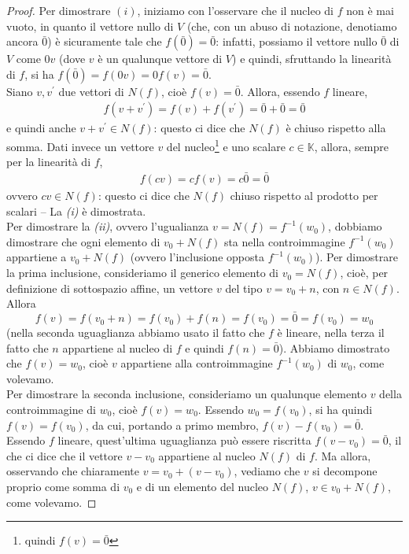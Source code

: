\begin{proof}
  Per dimostrare $(i)$, iniziamo con l'osservare che il nucleo di $f$ non è mai vuoto, in quanto il vettore
  nullo di $V$ (che, con un abuso di notazione, denotiamo ancora $\bar{0}$) è sicuramente tale che
  $f(\bar{0})=\bar{0}$: infatti, possiamo il vettore nullo $\bar{0}$ di $V$ come $0v$ (dove $v$ è un qualunque
  vettore di $V$) e quindi, sfruttando la linearità di $f$, si ha $f(\bar{0})=f(0v)=0f(v)=\bar{0}$.\\
  Siano $v,v^\prime$ due vettori di $N(f)$, cioè $f(v)=\bar{0}$. Allora, essendo $f$ lineare,
  \begin{eqnarray*}
    f(v+v^\prime)=f(v)+f(v^\prime)=\bar{0}+\bar{0}=\bar{0}
  \end{eqnarray*}
  e quindi anche $v+v^\prime\in N(f)$: questo ci dice che $N(f)$ è chiuso rispetto alla somma.
  Dati invece un vettore $v$ del nucleo\footnote{quindi $f(v)=\bar{0}$} e uno scalare $c\in
  \mathds{K}$, allora, sempre per la linearità di $f$,
  \begin{eqnarray*}
    f(cv)=cf(v)=c\bar{0}=\bar{0}
  \end{eqnarray*}
  ovvero $cv\in N(f)$: questo ci dice che $N(f)$ chiuso rispetto al prodotto per scalari -- La
  \textit{(i)} è dimostrata.\\
  Per dimostrare la \textit{(ii)}, ovvero l'ugualianza $v=N(f)=f^{-1}(w_0)$, dobbiamo dimostrare
  che ogni elemento di $v_0+N(f)$ sta nella controimmagine $f^{-1}(w_0)$ appartiene a $v_0+N(f)$
  (ovvero l'inclusione opposta $f^{-1}(w_0)$). Per dimostrare la prima inclusione, consideriamo il
  generico elemento di $v_0=N(f)$, cioè, per definizione di sottospazio affine, un vettore $v$ del
  tipo $v=v_0+n$, con $n\in N(f)$. Allora
  \begin{equation*}
    f(v)=f(v_0+n)=f(v_0)+f(n)=f(v_0)=\bar{0}=f(v_0)=w_0
  \end{equation*}
  (nella seconda uguaglianza abbiamo usato il fatto che $f$ è lineare, nella terza il fatto che $n$ appartiene
  al nucleo di $f$ e quindi $f(n)=\bar{0}$). Abbiamo dimostrato che $f(v)=w_0$, cioè $v$ appartiene alla
  controimmagine $f^{-1}(w_0)$ di $w_0$, come volevamo.\\
  Per dimostrare la seconda inclusione, consideriamo un qualunque elemento $v$ della controimmagine di $w_0$,
  cioè $f(v)=w_0$. Essendo $w_0=f(v_0)$, si ha quindi $f(v)=f(v_0)$, da cui, portando a primo membro,
  $f(v)-f(v_0)=\bar{0}$. Essendo $f$ lineare, quest'ultima uguaglianza può essere riscritta $f(v-v_0)=\bar{0}$,
  il che ci dice che il vettore $v-v_0$ appartiene al nucleo $N(f)$ di $f$. Ma allora, osservando che chiaramente
  $v=v_0+(v-v_0)$, vediamo che $v$ si decompone proprio come somma di $v_0$ e di un elemento del nucleo $N(f)$,
  $v\in v_0+N(f)$, come volevamo.
\end{proof}

